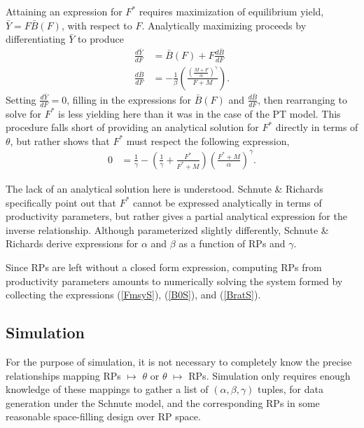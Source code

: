%
Attaining an expression for $F^*$ requires maximization of equilibrium
yield, \mbox{$\bar{Y}=F\bar{B}(F)$}, with respect to $F$. Analytically maximizing
proceeds by differentiating $\bar{Y}$ to produce
%
\begin{align}
\frac{d \bar{Y}}{dF} &= \bar B(F) + F \frac{d \bar B}{dF} \label{FderivS}\\
\frac{d \bar B}{dF} &= -\frac{1}{\beta}  \left(\frac{\left(\frac{M+F}{\alpha}\right)^\gamma}{F+M}\right)\label{dBdFS}.
\end{align}
%
Setting $\frac{d \bar{Y}}{dF}=0$, filling in the expressions for $\bar B(F)$
and $\frac{d \bar B}{dF}$, then rearranging to solve for $F^*$ is less
yielding here than it was in the case of the PT model. This procedure falls
short of providing an analytical solution for $F^*$ directly in terms of
$\theta$, %
but rather shows that $F^*$ must respect the following expression,
%
\begin{align}\label{FmsyS}
0 &= \frac{1}{\gamma} - \left(\frac{1}{\gamma} + \frac{F^*}{F^*+M}\right)\left(\frac{F^*+M}{\alpha}\right)^\gamma.
\end{align}

The lack of an analytical solution here is understood.
Schnute \& Richards \cite[pg. 519]{schnute_analytical_1998} specifically point out that
$F^*$ cannot be expressed analytically in terms of productivity parameters,
but rather gives a partial analytical expression for the inverse relationship.
Although parameterized slightly differently, Schnute \& Richards %
derive expressions for $\alpha$ and $\beta$ as a function of RPs and $\gamma$.

%
Since RPs are left without a closed form expression, computing RPs from
productivity parameters amounts to numerically solving the system formed by collecting the
expressions (\ref{FmsyS}), (\ref{B0S}), and (\ref{BratS}).

%
\subsection{Simulation \label{sSim}}

%
For the purpose of simulation, it is not necessary to completely know
the precise relationships mapping RPs $\mapsto$ $\theta$ or $\theta$ $\mapsto$
RPs. Simulation only requires enough knowledge of these mappings to gather a list
of $(\alpha, \beta, \gamma)$ tuples, for data generation under the Schnute model,
and the corresponding RPs in some reasonable space-filling design over RP space.

